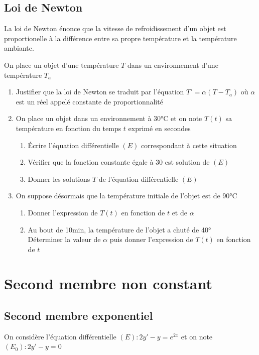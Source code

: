 \documentclass[oneside,12pt]{article}          %
\begin{document}
\subsection{Loi de Newton}
La loi de Newton énonce que la vitesse de refroidissement d'un objet est proportionelle à la différence entre sa propre température et la température ambiante.

On place un objet d'une température $T$ dans un environnement d'une température $T_a$

\begin{enumerate}
    \item Justifier que la loi de Newton se traduit par l'équation $T'=\alpha(T-T_a)$ où $\alpha$ est un réel appelé constante de proportionnalité
    \item On place un objet dans un environnement à 30°C et on note $T(t)$ sa température en fonction du temps $t$ exprimé en secondes
    \begin{enumerate}
        
    \item Écrire l'équation différentielle $(E)$ correspondant à cette situation
    \item Vérifier que la fonction constante égale à 30 est solution de $(E)$
    \item Donner les solutions $T$ de l'équation différentielle $(E)$
    \end{enumerate}
    \item On suppose désormais que la température initiale de l'objet est de 90°C
    \begin{enumerate}
        \item Donner l'expression de $T(t)$ en fonction de $t$ et de $\alpha$
        \item Au bout de 10min, la température de l'objet a chuté de 40°\\
        Déterminer la valeur de $\alpha$ puis donner l'expression de $T(t)$ en fonction de $t$
    \end{enumerate}
\end{enumerate}



\section{Second membre non constant}

\subsection{Second membre exponentiel}
  On considère l'équation différentielle $(E):2y'-y=e^{2x}$ et on note $(E_0):2y'-y=0$
\end{document}
